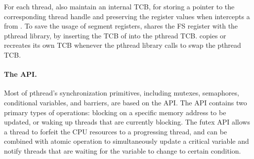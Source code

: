 For each thread, \thelibos{} also maintain an internal TCB,
for storing a pointer to the corresponding thread handle and preserving the register values when \thelibos{} intercepts a \linuxapi{} from \libc{}.
To save the usage of segment registers, \thelibos{} shares the FS register with the pthread library,
by inserting the TCB of \thelibos{} into the pthread TCB.
\thelibos{} copies or recreates its own TCB whenever the pthread library calls  to swap the pthread TCB.



\paragraph{The  API.}
Most of pthread's synchronization primitives, including mutexes, semaphores, conditional variables, and barriers,
are based on the  API.
The  API contains two primary types of operations:
blocking on a specific memory address to be updated, or waking up threads that are currently blocking. %
The futex API allows a thread to forfeit the CPU resources
to a progressing thread,
and can be combined with atomic operation
to simultaneously update a critical variable and notify threads that are waiting for the variable to change to certain condition.



